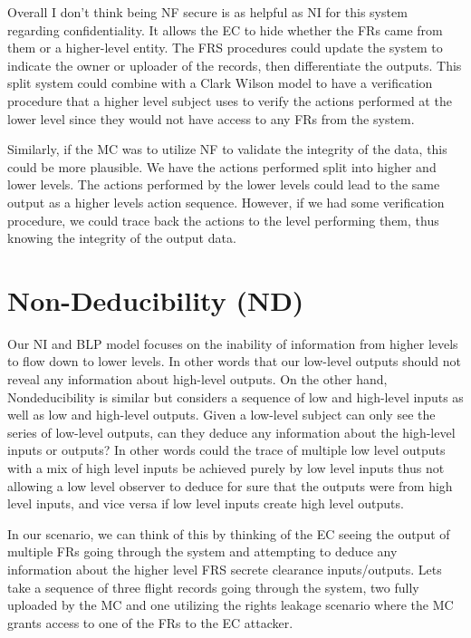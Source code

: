 \documentclass[10pt,journal,compsoc]{IEEEtran}
\begin{document}
Overall I don't think being NF secure is as helpful as NI for this system regarding confidentiality. It allows the EC to hide whether the FRs came from them or a higher-level entity. The FRS procedures could update the system to indicate the owner or uploader of the records, then differentiate the outputs. This split system could combine with a Clark Wilson model to have a verification procedure that a higher level subject uses to verify the actions performed at the lower level since they would not have access to any FRs from the system. 

Similarly, if the MC was to utilize NF to validate the integrity of the data, this could be more plausible. We have the actions performed split into higher and lower levels. The actions performed by the lower levels could lead to the same output as a higher levels action sequence. However, if we had some verification procedure, we could trace back the actions to the level performing them, thus knowing the integrity of the output data. 

\section{Non-Deducibility (ND)}

Our NI and BLP model focuses on the inability of information from higher levels to flow down to lower levels. In other words that our low-level outputs should not reveal any information about high-level outputs. On the other hand, Nondeducibility is similar but considers a sequence of low and high-level inputs as well as low and high-level outputs. Given a low-level subject can only see the series of low-level outputs, can they deduce any information about the high-level inputs or outputs? In other words could the trace of multiple low level outputs with a mix of high level inputs be achieved purely by low level inputs thus not allowing a low level observer to deduce for sure that the outputs were from high level inputs, and vice versa if low level inputs create high level outputs. 

In our scenario, we can think of this by thinking of the EC seeing the output of multiple FRs going through the system and attempting to deduce any information about the higher level FRS secrete clearance inputs/outputs. Lets take a sequence of three flight records going through the system, two fully uploaded by the MC and one utilizing the rights leakage scenario where the MC grants access to one of the FRs to the EC attacker. 
\end{document}
